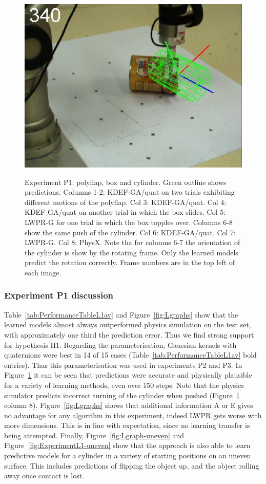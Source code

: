 \begin{figure}[htbp]
{\includegraphics[width=\imgAXwid]{./A3_physx_39_5}
}
\caption {Experiment P1: polyflap, box and cylinder. Green outline shows
  predictions. Columns 1-2: KDEF-GA/quat on two trials exhibiting
  different motions of the polyflap. Col 3: KDEF-GA/quat. Col 4: KDEF-GA/quat on another trial in
  which the box slides. Col 5: LWPR-G for one trial in
  which the box topples over.  Columns 6-8 show the same push of the
  cylinder. Col 6: KDEF-GA/quat. Col 7: LWPR-G. Col 8: PhysX. Note tha
  for columns 6-7 the orientation of the cylinder is show by the
  rotating frame. Only the learned models predict the rotation
  correctly. Frame numbers are in the top left of each image. }
\label{fig:ExperimentL2}
\end{figure}
\subsubsection{Experiment P1 discussion} Table~\ref{tab:PerformanceTableL1av} and Figure~\ref{fig:Lgraphs} show that the learned models almost always outperformed physics simulation on the test set, with approximately one third the prediction error. Thus we find strong support for hypothesis H1. Regarding the parameterisation, Gaussian kernels with quaternions were best in 14 of 15 cases  (Table~\ref{tab:PerformanceTableL1av} bold entries). Thus this parameterisation was used in experiments P2 and P3.
In Figure~\ref{fig:ExperimentL2} it can be
seen that predictions were accurate and physically plausible for a
variety of learning methods, even over 150 steps. Note that the physics
simulator predicts incorrect turning of the cylinder when pushed
(Figure~\ref{fig:ExperimentL2} column 8). Figure~\ref{fig:Lgraphs} shows that additional information A or E gives no advantage for any algorithm in this experiment, indeed LWPR gets worse with more dimensions. This is in line with expectation, since no learning transfer is being attempted. Finally, Figure~\ref{fig:Lgraph-uneven} and Figure~\ref{fig:ExperimentL1-uneven} show that the approach is also able to learn predictive models for a cylinder in a variety of starting positions on an uneven surface. This includes predictions of flipping the object up, and the object rolling away once contact is lost.

